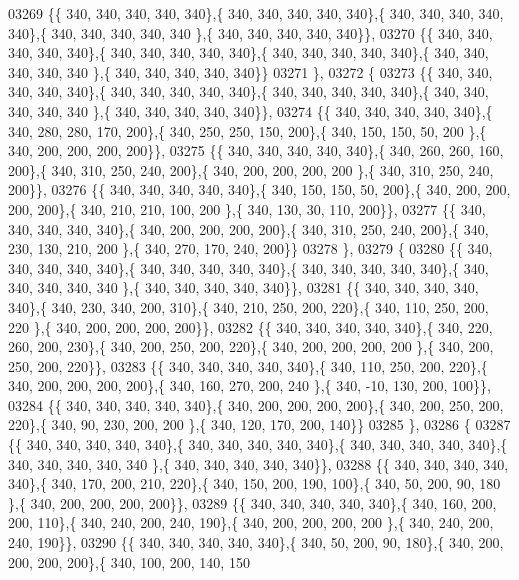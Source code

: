 \begin{DoxyCode}
03269 \{\{ 340, 340, 340, 340, 340\},\{ 340, 340, 340, 340, 340\},\{ 340, 340, 340, 340, 340\},\{ 340, 340, 340, 340, 340
      \},\{ 340, 340, 340, 340, 340\}\},
03270 \{\{ 340, 340, 340, 340, 340\},\{ 340, 340, 340, 340, 340\},\{ 340, 340, 340, 340, 340\},\{ 340, 340, 340, 340, 340
      \},\{ 340, 340, 340, 340, 340\}\}
03271 \},
03272 \{
03273 \{\{ 340, 340, 340, 340, 340\},\{ 340, 340, 340, 340, 340\},\{ 340, 340, 340, 340, 340\},\{ 340, 340, 340, 340, 340
      \},\{ 340, 340, 340, 340, 340\}\},
03274 \{\{ 340, 340, 340, 340, 340\},\{ 340, 280, 280, 170, 200\},\{ 340, 250, 250, 150, 200\},\{ 340, 150, 150,  50, 200
      \},\{ 340, 200, 200, 200, 200\}\},
03275 \{\{ 340, 340, 340, 340, 340\},\{ 340, 260, 260, 160, 200\},\{ 340, 310, 250, 240, 200\},\{ 340, 200, 200, 200, 200
      \},\{ 340, 310, 250, 240, 200\}\},
03276 \{\{ 340, 340, 340, 340, 340\},\{ 340, 150, 150,  50, 200\},\{ 340, 200, 200, 200, 200\},\{ 340, 210, 210, 100, 200
      \},\{ 340, 130,  30, 110, 200\}\},
03277 \{\{ 340, 340, 340, 340, 340\},\{ 340, 200, 200, 200, 200\},\{ 340, 310, 250, 240, 200\},\{ 340, 230, 130, 210, 200
      \},\{ 340, 270, 170, 240, 200\}\}
03278 \},
03279 \{
03280 \{\{ 340, 340, 340, 340, 340\},\{ 340, 340, 340, 340, 340\},\{ 340, 340, 340, 340, 340\},\{ 340, 340, 340, 340, 340
      \},\{ 340, 340, 340, 340, 340\}\},
03281 \{\{ 340, 340, 340, 340, 340\},\{ 340, 230, 340, 200, 310\},\{ 340, 210, 250, 200, 220\},\{ 340, 110, 250, 200, 220
      \},\{ 340, 200, 200, 200, 200\}\},
03282 \{\{ 340, 340, 340, 340, 340\},\{ 340, 220, 260, 200, 230\},\{ 340, 200, 250, 200, 220\},\{ 340, 200, 200, 200, 200
      \},\{ 340, 200, 250, 200, 220\}\},
03283 \{\{ 340, 340, 340, 340, 340\},\{ 340, 110, 250, 200, 220\},\{ 340, 200, 200, 200, 200\},\{ 340, 160, 270, 200, 240
      \},\{ 340, -10, 130, 200, 100\}\},
03284 \{\{ 340, 340, 340, 340, 340\},\{ 340, 200, 200, 200, 200\},\{ 340, 200, 250, 200, 220\},\{ 340,  90, 230, 200, 200
      \},\{ 340, 120, 170, 200, 140\}\}
03285 \},
03286 \{
03287 \{\{ 340, 340, 340, 340, 340\},\{ 340, 340, 340, 340, 340\},\{ 340, 340, 340, 340, 340\},\{ 340, 340, 340, 340, 340
      \},\{ 340, 340, 340, 340, 340\}\},
03288 \{\{ 340, 340, 340, 340, 340\},\{ 340, 170, 200, 210, 220\},\{ 340, 150, 200, 190, 100\},\{ 340,  50, 200,  90, 180
      \},\{ 340, 200, 200, 200, 200\}\},
03289 \{\{ 340, 340, 340, 340, 340\},\{ 340, 160, 200, 200, 110\},\{ 340, 240, 200, 240, 190\},\{ 340, 200, 200, 200, 200
      \},\{ 340, 240, 200, 240, 190\}\},
03290 \{\{ 340, 340, 340, 340, 340\},\{ 340,  50, 200,  90, 180\},\{ 340, 200, 200, 200, 200\},\{ 340, 100, 200, 140, 150

\end{DoxyCode}
